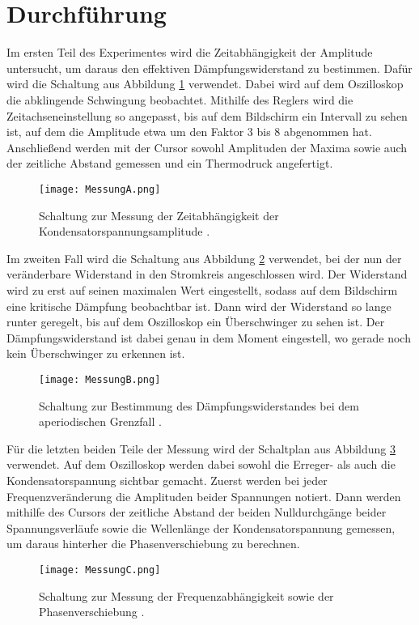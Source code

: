 \newpage

\section{Durchführung}

Im ersten Teil des Experimentes wird die Zeitabhängigkeit der Amplitude untersucht,
um daraus den effektiven Dämpfungswiderstand zu bestimmen. Dafür wird die Schaltung
aus Abbildung \ref{fig:MessungA} verwendet. Dabei wird auf dem Oszilloskop die abklingende Schwingung
beobachtet. Mithilfe des Reglers wird die Zeitachseneinstellung so angepasst, bis
auf dem Bildschirm ein Intervall zu sehen ist, auf dem die Amplitude etwa um
den Faktor 3 bis 8 abgenommen hat. Anschließend werden mit der Cursor sowohl
Amplituden der Maxima sowie auch der zeitliche Abstand gemessen und ein Thermodruck
angefertigt.

\FloatBarrier
\begin{figure}
  \centering
  \texttt{[image: MessungA.png]}
  \caption{Schaltung zur Messung der Zeitabhängigkeit der Kondensatorspannungsamplitude \cite{anleitung01}.}
  \label{fig:MessungA}
\end{figure}
\FloatBarrier

Im zweiten Fall wird die Schaltung aus Abbildung \ref{fig:MessungB} verwendet, bei der nun der
veränderbare Widerstand in den Stromkreis angeschlossen wird. Der Widerstand wird
zu erst auf seinen maximalen Wert eingestellt, sodass auf dem Bildschirm eine
kritische Dämpfung beobachtbar ist. Dann wird der Widerstand so lange runter geregelt, bis
auf dem Oszilloskop ein Überschwinger zu sehen ist. Der Dämpfungswiderstand ist
dabei genau in dem Moment eingestell, wo gerade noch kein Überschwinger zu erkennen
ist.

\FloatBarrier
\begin{figure}
  \centering
  \texttt{[image: MessungB.png]}
  \caption{Schaltung zur Bestimmung des Dämpfungswiderstandes bei dem aperiodischen Grenzfall \cite{anleitung01}.}
  \label{fig:MessungB}
\end{figure}
\FloatBarrier

Für die letzten beiden Teile der Messung wird der Schaltplan aus Abbildung \ref{fig:MessungC} verwendet.
Auf dem Oszilloskop werden dabei sowohl die Erreger- als auch die Kondensatorspannung
sichtbar gemacht. Zuerst werden bei jeder Frequenzveränderung die Amplituden beider
Spannungen notiert. Dann werden mithilfe des Cursors der zeitliche Abstand der beiden
Nulldurchgänge beider Spannungsverläufe sowie die Wellenlänge der Kondensatorspannung
gemessen, um daraus hinterher die Phasenverschiebung zu berechnen.

\FloatBarrier
\begin{figure}
  \centering
  \texttt{[image: MessungC.png]}
  \caption{Schaltung zur Messung der Frequenzabhängigkeit sowie der Phasenverschiebung \cite{anleitung01}.}
  \label{fig:MessungC}
\end{figure}
\FloatBarrier



\printbibliography


